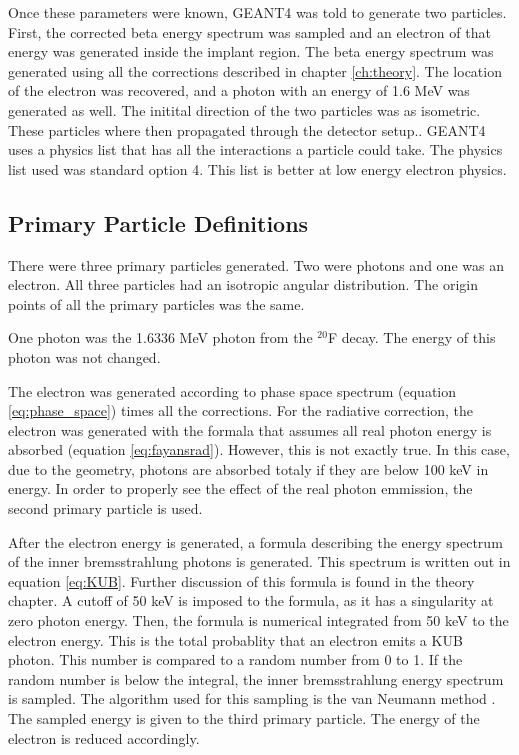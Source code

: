 Once these parameters were known, GEANT4 was told to generate two particles.
First, the corrected beta energy spectrum was sampled and an electron of that energy was generated inside the implant region.
The beta energy spectrum was generated using all the corrections described in chapter \ref{ch:theory}. 
The location of the electron was recovered, and a photon with an energy of  1.6 MeV was generated as well.
The initital direction of the two particles was as isometric.
These particles where then propagated through the detector setup..
GEANT4 uses a physics list that has all the interactions a particle could take.
The physics list used was standard option 4.
This list is better at low energy electron physics. 

\subsection{Primary Particle Definitions}
There were three primary particles generated.
Two were photons and one was an electron.
All three particles had an isotropic angular distribution.
The origin points of all the primary particles was the same.

One photon was the 1.6336 MeV photon from the $^{20}$F decay.
The energy of this photon was not changed.

The electron was generated according to phase space spectrum (equation \ref{eq:phase_space}) times all the corrections.
For the radiative correction, the electron was generated with the formala that assumes all real photon energy is absorbed (equation \ref{eq:fayansrad}).
However, this is not exactly true. 
In this case, due to the geometry, photons are absorbed totaly if they are below 100 keV in energy.
In order to properly see the effect of the real photon emmission, the second primary particle is used.

After the electron energy is generated, a formula describing the energy spectrum of the inner bremsstrahlung photons is generated. 
This spectrum is written out in equation \ref{eq:KUB}. %
Further discussion of this formula is found in the theory chapter.
A cutoff of 50 keV is imposed to the formula, as it has a singularity at zero photon energy.
Then, the formula is numerical integrated from 50 keV to the electron energy.
This is the total probablity that an electron emits a KUB photon.
This number is compared to a random number from 0 to 1.
If the random number is below the integral, the inner bremsstrahlung energy spectrum is sampled.
The algorithm used for this sampling is the van Neumann method \cite{neu51}.
The sampled energy is given to the third primary particle.
The energy of the electron is reduced accordingly.

